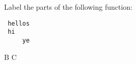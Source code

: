 \documentclass{article}
\begin{document}
\maketitle

\begin{subq}
 \subqs Label the parts of the following function: 
 \begin{lstlisting}
 hellos
 hi
     ye
 \end{lstlisting}
 \subqs B
 \subqs C
\end{subq}
\newpage
\end{document}
